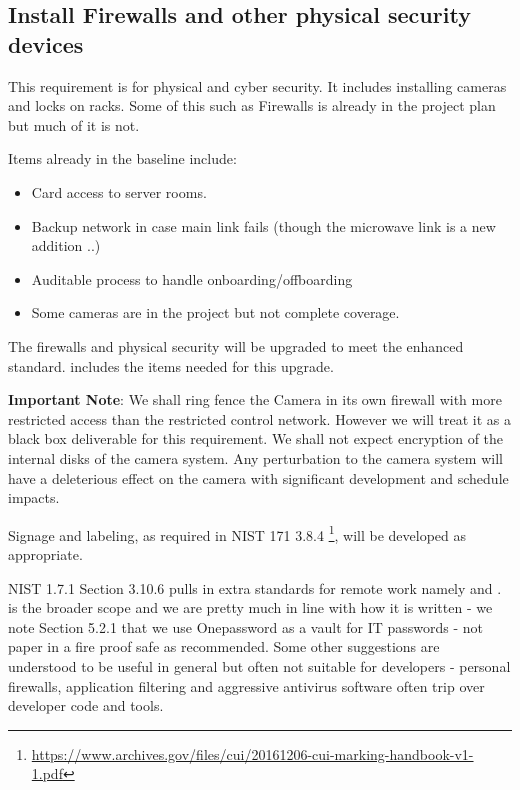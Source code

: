 
\subsection{Install Firewalls and other physical security devices} \label{sec:2firewalls}

This requirement is for physical and cyber security. It includes installing cameras and locks on racks.
Some of this such as Firewalls is already in the project plan but much of it is not.

Items already in the baseline include:
\begin{itemize}
\item Card access to server rooms.
\item Backup network in case main link fails (though the microwave link is a new addition ..)
\item Auditable process to handle onboarding/offboarding
\item Some cameras are in the project but not complete coverage.

\end{itemize}

The firewalls and physical security will be upgraded to meet the enhanced standard.  includes the items needed for this upgrade.

{\bf Important Note}: We shall ring fence the \gls{Camera} in its own firewall with more restricted access than the restricted control network.
However we will treat it as a black box deliverable for this requirement. We shall not expect encryption of the internal disks of the \gls{camera} system. Any perturbation to the \gls{camera} system will have a deleterious effect on the \gls{camera} with significant development and schedule impacts.

Signage and labeling, as required in \gls{NIST} 171 3.8.4 \footnote{\url{https://www.archives.gov/files/cui/20161206-cui-marking-handbook-v1-1.pdf}}, will be developed as appropriate.

NIST 1.7.1 Section 3.10.6 pulls in extra standards for remote work namely  and .
 is the broader scope and we are pretty much in line with how it is written - we note Section 5.2.1 that we use Onepassword as a vault for \gls{IT} passwords - not paper in a fire proof safe as recommended.
Some other suggestions are understood to be useful in general but often not suitable for developers - personal firewalls, application filtering  and aggressive antivirus \gls{software} often trip over developer code and tools.

